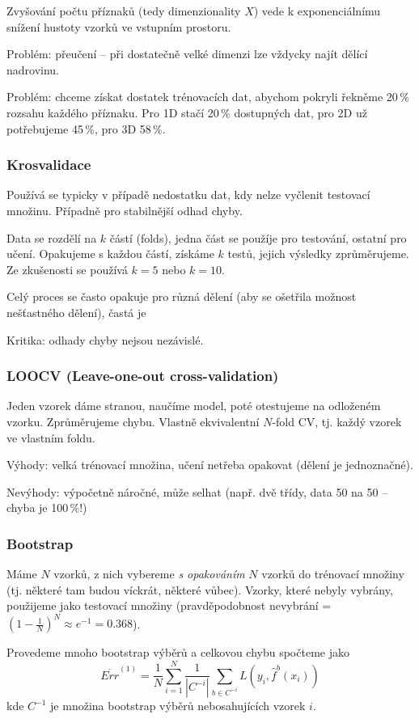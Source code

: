 \documentclass[11pt]{report} %
\numberwithin{equation}{section}
\begin{document}
Zvyšování počtu příznaků (tedy dimenzionality $X$) vede k exponenciálnímu snížení hustoty vzorků ve vstupním prostoru. 

Problém: přeučení -- při dostatečně velké dimenzi lze vždycky najít dělící nadrovinu.

Problém: chceme získat dostatek trénovacích dat, abychom pokryli řekněme 20\,\% rozsahu každého příznaku. Pro 1D stačí 20\,\% dostupných dat, pro 2D už potřebujeme 45\,\%, pro 3D 58\,\%.

\subsubsection{Krosvalidace}
Používá se typicky v případě nedostatku dat, kdy nelze vyčlenit testovací množinu. Případně pro stabilnější odhad chyby.

Data se rozdělí na $k$ částí (folds), jedna část se použíje pro testování, ostatní pro učení. Opakujeme s každou částí, získáme $k$ testů, jejich výsledky zprůměrujeme. Ze zkušenosti se používá $k = 5$ nebo $k = 10$. 

Celý proces se často opakuje pro různá dělení (aby se ošetřila možnost nešťastného dělení), častá je 

Kritika: odhady chyby nejsou nezávislé.

\subsubsection{LOOCV (Leave-one-out cross-validation)}
Jeden vzorek dáme stranou, naučíme model, poté otestujeme na odloženém vzorku. Zprůměrujeme chybu. Vlastně ekvivalentní $N$-fold CV, tj. každý vzorek ve vlastním foldu. 

Výhody: velká trénovací množina, učení netřeba opakovat (dělení je jednoznačné).

Nevýhody: výpočetně náročné, může selhat (např. dvě třídy, data 50 na 50 -- chyba je 100\,\%!)

\subsubsection{Bootstrap}
Máme $N$ vzorků, z nich vybereme \textit{s opakováním} $N$ vzorků do trénovací množiny (tj. některé tam budou víckrát, některé vůbec). Vzorky, které nebyly vybrány, použijeme jako testovací množiny (pravděpodobnost nevybrání = $(1-\frac{1}{N})^N \approx e^{-1} =0.368$).

Provedeme mnoho bootstrap výběrů a celkovou chybu spočteme jako 
$$\overline{Err}^{(1)} = \frac{1}{N}\sum_{i=1}^{N}\frac{1}{|C^{-i}|}\sum_{b\in C^{-i}} L(y_i, \hat{f}^{b}(x_i))$$
kde $C^{-1}$ je množina bootstrap výběrů nebosahujících vzorek $i$.
\end{document}
